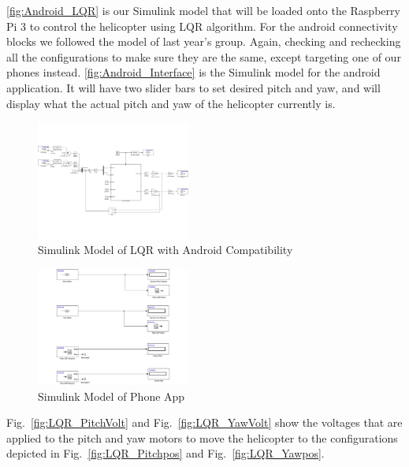 \documentclass[letterpaper, 10pt, conference]{ieeeconf}
\begin{document}
\autoref{fig:Android_LQR} is our Simulink model that will be loaded onto the Raspberry Pi 3 to control the helicopter using LQR algorithm.  For the android connectivity blocks we followed the model of last year's group.  Again, checking and rechecking all the configurations to make sure they are the same, except targeting one of our phones instead.  \autoref{fig:Android_Interface} is the Simulink model for the android application.  It will have two slider bars to set desired pitch and yaw, and will display what the actual pitch and yaw of the helicopter currently is.
%
\begin{figure}
  \centering
  \includegraphics[width=0.45\textwidth]{figs/img/Android_LQR}
  \caption{Simulink Model of LQR with Android Compatibility}
  \label{fig:Android_LQR}
\end{figure}
%
\begin{figure}
  \centering
  \includegraphics[width=0.45\textwidth]{figs/img/Android_Interface}
  \caption{Simulink Model of Phone App}
  \label{fig:Android_Interface}
\end{figure}
%
Fig.~\ref{fig:LQR_PitchVolt} and Fig.~\ref{fig:LQR_YawVolt} show the voltages that are applied to the pitch and yaw motors to move the helicopter to the configurations depicted in Fig.~\ref{fig:LQR_Pitchpos} and Fig.~\ref{fig:LQR_Yawpos}.
%
\end{document}
